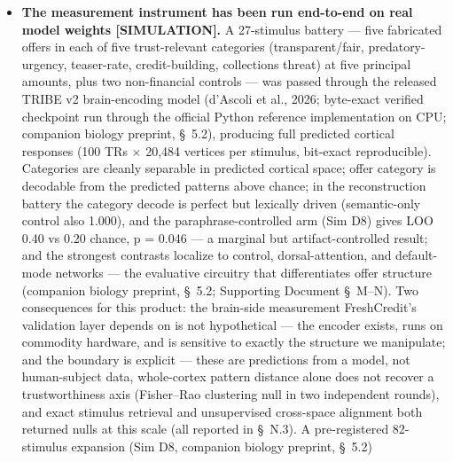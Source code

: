 \documentclass[
]{article}
\newenvironment{Shaded}{}{}
\newcommand{\NormalTok}[1]{#1}
\begin{document}
\begin{itemize}
\begin{Shaded}
\begin{Highlighting}[]
\NormalTok{\textbackslash{}begin\{equation\}}
\NormalTok{K\_\{\textbackslash{}mathrm\{eff\}\} = K(1{-}\textbackslash{}ell), \textbackslash{}qquad \textbackslash{}sigma\_\{\textbackslash{}eta\} = \textbackslash{}pi\textbackslash{}ell/2}
\NormalTok{\textbackslash{}label\{eq:leakage\}}
\NormalTok{\textbackslash{}end\{equation\}}
\end{Highlighting}
\end{Shaded}
\item
  \textbf{The measurement instrument has been run end-to-end on real
  model weights {[}SIMULATION{]}.} A 27-stimulus battery --- five
  fabricated offers in each of five trust-relevant categories
  (transparent/fair, predatory-urgency, teaser-rate, credit-building,
  collections threat) at five principal amounts, plus two non-financial
  controls --- was passed through the released TRIBE v2 brain-encoding
  model (d'Ascoli et al., 2026; byte-exact verified checkpoint run
  through the official Python reference implementation on CPU; companion
  biology preprint, §~5.2), producing full predicted cortical responses
  (100 TRs \(\times\) 20,484 vertices per stimulus, bit-exact
  reproducible). Categories are cleanly separable in predicted cortical
  space; offer category is decodable from the predicted patterns above
  chance; in the reconstruction battery the category decode is perfect
  but lexically driven (semantic-only control also 1.000), and the
  paraphrase-controlled arm (Sim D8) gives LOO 0.40 vs 0.20 chance, p =
  0.046 --- a marginal but artifact-controlled result; and the strongest
  contrasts localize to control, dorsal-attention, and default-mode
  networks --- the evaluative circuitry that differentiates offer
  structure (companion biology preprint, §~5.2; Supporting Document
  §~M--N). Two consequences for this product: the brain-side measurement
  FreshCredit's validation layer depends on is not hypothetical --- the
  encoder exists, runs on commodity hardware, and is sensitive to
  exactly the structure we manipulate; and the boundary is explicit ---
  these are predictions from a model, not human-subject data,
  whole-cortex pattern distance alone does not recover a trustworthiness
  axis (Fisher--Rao clustering null in two independent rounds), and
  exact stimulus retrieval and unsupervised cross-space alignment both
  returned nulls at this scale (all reported in §~N.3). A pre-registered
  82-stimulus expansion (Sim D8, companion biology preprint, §~5.2)

\end{itemize}
\end{document}
